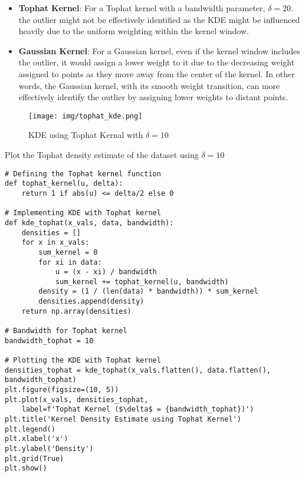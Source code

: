 \documentclass{article}
\begin{document}
\begin{itemize}
    \item \textbf{Tophat Kernel}: For a Tophat kernel with a bandwidth parameter, \(\delta = 20\). the outlier might not be effectively identified as the KDE might be influenced heavily due to the uniform weighting within the kernel window.
    \item \textbf{Gaussian Kernel}: For a Gaussian kernel, even if the kernel window includes the outlier, it would assign a lower weight to it due to the decreasing weight assigned to points as they move away from the center of the kernel. In other words, the Gaussian kernel, with its smooth weight transition, can more effectively identify the outlier by assigning lower weights to distant points.
\end{itemize}

\begin{figure}
    \centering
    \texttt{[image: img/tophat\_kde.png]}
    \caption{KDE using Tophat Kernal with  \(\delta = 10\)}
    \label{fig:kde_tophat}
\end{figure}

\begin{listing}[H]
\caption{Plot the Tophat density estimate of the dataset using  \(\delta = 10 \) }
\label{code:kde_tophat}
\begin{verbatim}
# Defining the Tophat kernel function
def tophat_kernel(u, delta):
    return 1 if abs(u) <= delta/2 else 0

# Implementing KDE with Tophat kernel
def kde_tophat(x_vals, data, bandwidth):
    densities = []
    for x in x_vals:
        sum_kernel = 0
        for xi in data:
            u = (x - xi) / bandwidth
            sum_kernel += tophat_kernel(u, bandwidth)
        density = (1 / (len(data) * bandwidth)) * sum_kernel
        densities.append(density)
    return np.array(densities)

# Bandwidth for Tophat kernel
bandwidth_tophat = 10

# Plotting the KDE with Tophat kernel
densities_tophat = kde_tophat(x_vals.flatten(), data.flatten(), bandwidth_tophat)
plt.figure(figsize=(10, 5))
plt.plot(x_vals, densities_tophat, 
    label=f'Tophat Kernel ($\delta$ = {bandwidth_tophat})')
plt.title('Kernel Density Estimate using Tophat Kernel')
plt.legend()
plt.xlabel('x')
plt.ylabel('Density')
plt.grid(True)
plt.show()
\end{verbatim}
\end{listing}
\end{document}
